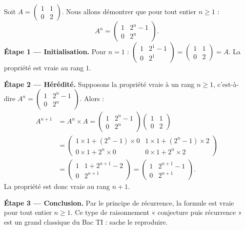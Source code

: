 \documentclass[11pt]{article}
\begin{document}
\begin{experience}
Soit $A = \begin{pmatrix} 1 & 1 \\ 0 & 2 \end{pmatrix}$. Nous allons démontrer que pour tout entier $n \geq 1$ :
\[ A^n = \begin{pmatrix} 1 & 2^n - 1 \\ 0 & 2^n \end{pmatrix}. \]
\textbf{Étape 1 — Initialisation.} Pour $n = 1$ : $\begin{pmatrix} 1 & 2^1 - 1 \\ 0 & 2^1 \end{pmatrix} = \begin{pmatrix} 1 & 1 \\ 0 & 2 \end{pmatrix} = A$. La propriété est vraie au rang $1$.

\textbf{Étape 2 — Hérédité.} Supposons la propriété vraie à un rang $n \geq 1$, c'est-à-dire $A^n = \begin{pmatrix} 1 & 2^n - 1 \\ 0 & 2^n \end{pmatrix}$. Alors :
\begin{align*}
A^{n+1} &= A^n \times A = \begin{pmatrix} 1 & 2^n - 1 \\ 0 & 2^n \end{pmatrix}\begin{pmatrix} 1 & 1 \\ 0 & 2 \end{pmatrix} \\
&= \begin{pmatrix} 1\times 1 + (2^n-1)\times 0 & 1\times 1 + (2^n - 1)\times 2 \\ 0\times 1 + 2^n \times 0 & 0\times 1 + 2^n \times 2 \end{pmatrix} \\
&= \begin{pmatrix} 1 & 1 + 2^{n+1} - 2 \\ 0 & 2^{n+1} \end{pmatrix} = \begin{pmatrix} 1 & 2^{n+1} - 1 \\ 0 & 2^{n+1} \end{pmatrix}.
\end{align*}
La propriété est donc vraie au rang $n+1$.

\textbf{Étape 3 — Conclusion.} Par le principe de récurrence, la formule est vraie pour tout entier $n \geq 1$. Ce type de raisonnement « conjecture puis récurrence » est un grand classique du Bac TI : sache le reproduire.
\end{experience}
\end{document}
